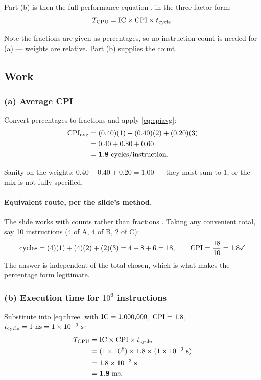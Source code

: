 Part (b) is then the full performance equation ,
in the three-factor form:
\begin{equation}
  T_{\mathrm{CPU}} = \mathrm{IC} \times \mathrm{CPI} \times t_{\mathrm{cycle}}.
  \label{eq:three}
\end{equation}

Note the fractions are given as percentages, so no instruction count is needed
for (a) --- weights are relative. Part (b) supplies the count.

\subsection*{Work}

\subsubsection*{(a) Average CPI}

Convert percentages to fractions and apply \eqref{eq:cpiavg}:
\begin{align}
  \mathrm{CPI}_{\text{avg}} &= (0.40)(1) + (0.40)(2) + (0.20)(3) \\
                    &= 0.40 + 0.80 + 0.60 \\
                    &= \mathbf{1.8\ \text{cycles/instruction.}}
\end{align}

Sanity on the weights: $0.40 + 0.40 + 0.20 = 1.00$ \checkmark{} --- they must sum
to 1, or the mix is not fully specified.

\paragraph{Equivalent route, per the slide's method.}
The slide works with counts rather than fractions .
Taking any convenient total, say 10 instructions (4 of A, 4 of B, 2 of C):
\begin{equation}
  \text{cycles} = (4)(1) + (4)(2) + (2)(3) = 4 + 8 + 6 = 18,
  \qquad \mathrm{CPI} = \frac{18}{10} = 1.8 \checkmark
\end{equation}
The answer is independent of the total chosen, which is what makes the
percentage form legitimate.

\subsubsection*{(b) Execution time for $10^{6}$ instructions}

Substitute into \eqref{eq:three} with $\mathrm{IC} = 1{,}000{,}000$,
$\mathrm{CPI} = 1.8$, $\cycletime = 1\ \text{ns} = 1\times10^{-9}\ \text{s}$:
\begin{align}
  \CPUtime &= \IC \times \CPI \times \cycletime \\
           &= (1\times10^{6}) \times 1.8 \times (1\times10^{-9}\ \text{s}) \\
           &= 1.8\times10^{-3}\ \text{s} \\
           &= \mathbf{1.8\ \text{ms.}}
\end{align}

